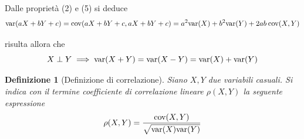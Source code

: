\documentclass{article}
\newtheorem{definition}{Definizione}
\begin{document}
            Dalle proprietà (2) e (5) si deduce
            \[
                \textnormal{var}(aX + bY + c) = \textnormal{cov}(aX + bY + c, aX + bY + c) = a^{2} \textnormal{var}(X) + b^{2} \textnormal{var}(Y) + 2ab \: \textnormal{cov}(X, Y)
            \]
            
            risulta allora che
            \[
                X \perp Y \implies \textnormal{var}(X + Y) = \textnormal{var}(X - Y) = \textnormal{var}(X) + \textnormal{var}(Y)
            \]

            \begin{definition}[Definizione di correlazione]
                Siano $X, Y$ due variabili casuali.
                Si indica con il termine coefficiente di correlazione lineare $\rho(X, Y)$ la seguente espressione
                \[
                    \rho(X, Y) = \frac{\textnormal{cov}(X, Y)}{\sqrt{\textnormal{var}(X)\textnormal{var}(Y)}}
                \]
            \end{definition}
\end{document}
